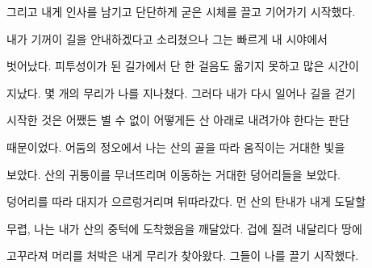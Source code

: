 그리고 내게 인사를 남기고 단단하게 굳은 시체를 끌고 기어가기 시작했다.

내가 기꺼이 길을 안내하겠다고 소리쳤으나 그는 빠르게 내 시야에서

벗어났다. 피투성이가 된 길가에서 단 한 걸음도 옮기지 못하고 많은 시간이

지났다. 몇 개의 무리가 나를 지나쳤다. 그러다 내가 다시 일어나 길을 걷기

시작한 것은 어쨌든 별 수 없이 어떻게든 산 아래로 내려가야 한다는 판단

때문이었다. 어둠의 정오에서 나는 산의 골을 따라 움직이는 거대한 빛을

보았다. 산의 귀퉁이를 무너뜨리며 이동하는 거대한 덩어리들을 보았다.

덩어리를 따라 대지가 으르렁거리며 뒤따라갔다. 먼 산의 탄내가 내게 도달할

무렵, 나는 내가 산의 중턱에 도착했음을 깨달았다. 겁에 질려 내달리다 땅에

고꾸라져 머리를 처박은 내게 무리가 찾아왔다. 그들이 나를 끌기 시작했다.

